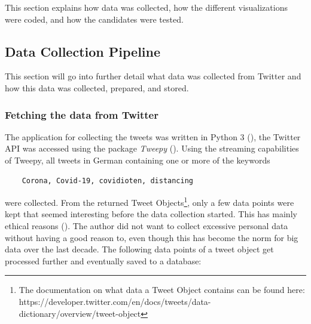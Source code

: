This section explains how data was collected, how the different visualizations were coded, and how the candidates were tested.

\subsection{Data Collection Pipeline}
This section will go into further detail what data was collected from Twitter and how this data was collected, prepared, and stored.

\subsubsection{Fetching the data from Twitter} \label{sec:fetchedData}

The application for collecting the tweets was written in Python 3 (\cite{10.5555/1593511}), the Twitter API was accessed using the package \emph{Tweepy} (\cite{roesslein2020tweepy}). Using the streaming capabilities of Tweepy, all tweets in German containing one or more of the keywords \begin{verbatim}
    Corona, Covid-19, covidioten, distancing
\end{verbatim}
were collected. From the returned Tweet Objects\footnote{The documentation on what data a Tweet Object contains can be found here: https://developer.twitter.com/en/docs/tweets/data-dictionary/overview/tweet-object}, only a few data points were kept that seemed interesting before the data collection started. This has mainly ethical reasons (\cite{richards2014big}). The author did not want to collect excessive personal data without having a good reason to, even though this has become the norm for big data over the last decade. The following data points of a tweet object get processed further and eventually saved to a database:


